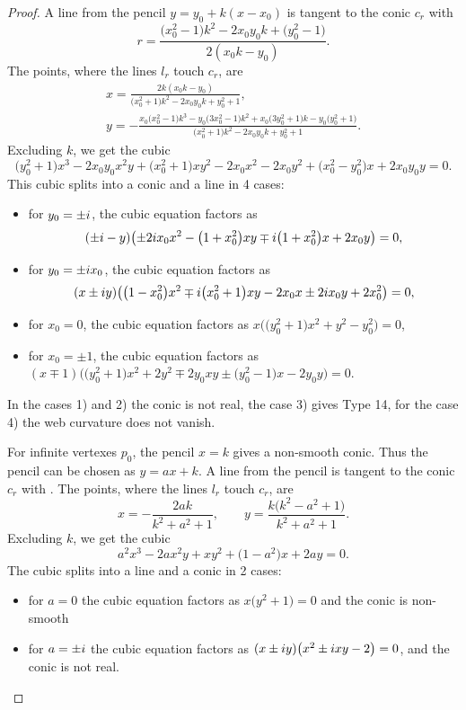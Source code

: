 \documentclass[11pt]{article}
\numberwithin{equation}{section}
\numberwithin{equation}{section}
\begin{document}
\begin{proof}
A line from the pencil $y=y_0+k(x-x_0)$ is tangent to the conic $c_r$ with
\[
r=\frac{\bigl(x_0^2 - 1\bigr)k^2 - 2x_0y_0k + \bigl(y_0^2 - 1\bigr)}{2(x_0k - y_0)}.
\]
 The points, where the lines $l_r$ touch $c_r$, are
\begin{gather*}
x=\frac{2k(x_0k - y_0)}{\bigl(x_0^2 + 1\bigr)k^2 - 2x_0y_0k + y_0^2 + 1},\\
y=-\frac{x_0\bigl(x_0^2 - 1\bigr)k^3 - y_0\bigl(3x_0^2 - 1\bigr)k^2 + x_0\bigl(3y_0^2 + 1\bigr)k - y_0\bigl(y_0^2 + 1\bigr)}{\bigl(x_0^2 + 1\bigr)k^2 - 2x_0y_0k + y_0^2 + 1}.
\end{gather*}
Excluding $k$, we get the cubic
\[
\bigl(y_0^2 + 1\bigr)x^3 - 2x_0y_0x^2y+ \bigl(x_0^2 + 1\bigr)xy^2 - 2x_0x^2 - 2x_0y^2 + \bigl(x_0^2 - y_0^2\bigr)x + 2x_0y_0y=0.
\]
This cubic splits into a conic and a line in 4
 cases:
 \begin{itemize}
\item[(1)] for $y_0=\pm {\rm i}$, the cubic equation factors as
\[
(\pm i-y)\bigl(\pm 2{\rm i}x_0x^2 -\bigl(1+x_0^2\bigr)xy \mp {\rm i}\bigl(1+x_0^2\bigr)x + 2x_0y\bigr)=0,
\]
\item[(2)] for $y_0=\pm {\rm i}x_0$, the cubic equation factors as
\[
 (x \pm {\rm i} y)\bigl(\bigl(1-x_0^2\bigr)x^2 \mp {\rm i} \bigl(x_0^2+1\bigr)xy - 2x_0x \pm2 {\rm i} x_0y + 2x_0^2\bigr)=0,
\]
\item[(3)] for $x_0=0$, the cubic equation factors as $x\bigl(\bigl(y_0^2 + 1\bigr)x^2 + y^2 - y_0^2\bigr)=0$,
\item[(4)] for $x_0=\pm 1$, the cubic equation factors as $(x\mp 1)\bigl(\bigl(y_0^2 + 1\bigr)x^2+2y^2 \mp 2y_0xy \pm \bigl(y_0^2 - 1\bigr)x - 2y_0y\bigr)=0$.
 \end{itemize}
In the cases 1) and 2) the conic is not real, the case 3) gives Type 14, for the case 4) the web curvature does not vanish.



For infinite vertexes $p_0$, the pencil $x=k$ gives a non-smooth conic. Thus the pencil can be chosen as $y=ax+k$. A line from the pencil is tangent to the conic $c_r$ with
.
 The points, where the lines $l_r$ touch $c_r$, are
\[
x=-\frac{2ak}{k^2+a^2+1}, \qquad y=\frac{k\bigl( k^2-a^2 + 1\bigr)}{k^2+a^2+1}.
\]
Excluding $k$, we get the cubic
\[
a^2x^3 - 2ax^2y + xy^2 +\bigl(1-a^2\bigr)x + 2ay=0.
\]
The cubic splits into a line and a conic in 2 cases:
\begin{itemize}
\item[(1)] for $a=0$ the cubic equation factors as $x\bigl(y^2+1\bigr)=0$ and the conic is non-smooth
\item[(2)] for $a=\pm {\rm i}$ the cubic equation factors as $(x \pm {\rm i} y)\bigl(x^2 \pm {\rm i} xy-2\bigr)=0$, and the conic is not real.
\end{itemize}



\end{proof}
\end{document}

